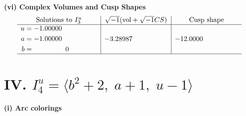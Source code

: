 \documentclass[1p]{elsarticle_modified}
\theoremstyle{definition}
\newcommand{\I}{\sqrt{-1}}
\begin{document}
\newpage\flushleft \textbf{(vi) Complex Volumes and Cusp Shapes}
$$\begin{array}{c|c|c}  
\text{Solutions to }I^u_{3}& \I (\text{vol} + \sqrt{-1}CS) & \text{Cusp shape}\\
 \hline 
\begin{aligned}
u &= -1.00000\phantom{ +0.000000I} \\
a &= -1.00000\phantom{ +0.000000I} \\
b &= \phantom{-0.000000 } 0\end{aligned}
 & -3.28987\phantom{ +0.000000I} & -12.0000\phantom{ +0.000000I}\\
 \hline 
 \end{array}$$\newpage\newpage\renewcommand{\arraystretch}{1}
\centering \section*{IV. $I^u_{4}= \langle b^2+2,\;a+1,\;u-1 \rangle$}
\flushleft \textbf{(i) Arc colorings}\\
\end{document}
